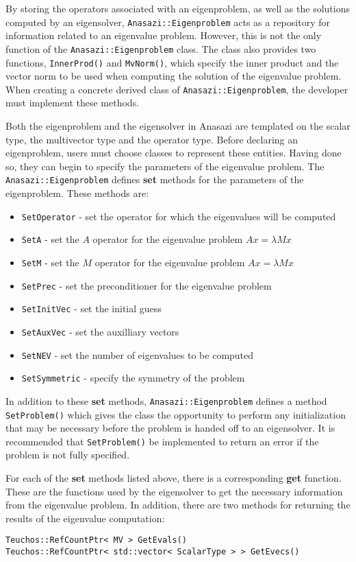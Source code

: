 By storing the operators associated with an eigenproblem, as well as the
solutions computed by an eigensolver, \verb!Anasazi::Eigenproblem! acts as a
repository for information related to an eigenvalue problem. However, this is
not the only function of the \verb!Anasazi::Eigenproblem! class. The class also
provides two functions, \verb!InnerProd()! and \verb!MvNorm()!, which specify
the inner product and the vector norm to be used when computing the solution of
the eigenvalue problem. When creating a concrete derived class of
\verb!Anasazi::Eigenproblem!, the developer must implement these methods.

Both the eigenproblem and the eigensolver in Anasazi are templated 
on the scalar type, the multivector type and the operator type. Before
declaring an eigenproblem, users must choose classes to represent these
entities. Having done so, they can begin to specify the parameters of the
eigenvalue problem. The \verb!Anasazi::Eigenproblem! defines \textbf{set} methods for
the parameters of the eigenproblem. These methods are:
\begin{itemize}
\item \verb!SetOperator! - set the operator for which the eigenvalues will be computed
\item \verb!SetA! - set the $A$ operator for the eigenvalue problem $Ax=\lambda M x$
\item \verb!SetM! - set the $M$ operator for the eigenvalue problem $Ax=\lambda M x$
\item \verb!SetPrec! - set the preconditioner for the eigenvalue problem
\item \verb!SetInitVec! - set the initial guess
\item \verb!SetAuxVec! - set the auxilliary vectors
\item \verb!SetNEV! - set the number of eigenvalues to be computed
\item \verb!SetSymmetric! - specify the symmetry of the problem
\end{itemize}
In addition to these \textbf{set} methods, \verb!Anasazi::Eigenproblem! defines
a method \verb!SetProblem()! which gives the class the opportunity to perform
any initialization that may be necessary before the problem is handed off to an
eigensolver. It is recommended that \verb!SetProblem()! be implemented to
return an error if the problem is not fully specified.

For each of the \textbf{set} methods listed above, there is a corresponding
\textbf{get} function. These are the functions used by the eigensolver to get
the necessary information from the eigenvalue problem. In addition, there are
two methods for returning the results of the eigenvalue computation:
\begin{verbatim}
Teuchos::RefCountPtr< MV > GetEvals()
Teuchos::RefCountPtr< std::vector< ScalarType > > GetEvecs()
\end{verbatim}

